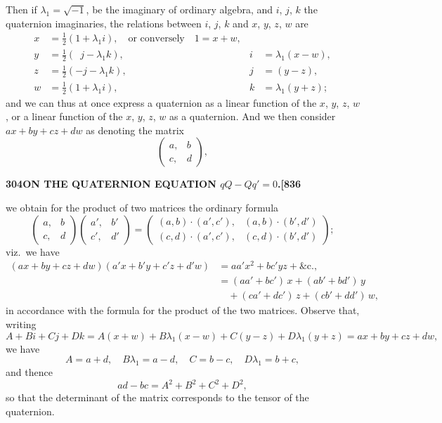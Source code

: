 \documentclass[11pt]{article}
\begin{document}
\medskip

Then if $\lambda_{1} = \sqrt{-1}$, be the imaginary of ordinary algebra, and $i$, $j$, $k$ the quaternion imaginaries, the relations between $i$, $j$, $k$ and $x$, $y$, $z$, $w$ are
\begin{align*}
x &= \tfrac{1}{2}(1 + \lambda_{1}i),\quad \text{or conversely}\quad 1 = x + w, \\
y &= \tfrac{1}{2}(\phantom{1}j - \lambda_{1}k),\quad &i &= \lambda_{1}(x - w), \\
z &= \tfrac{1}{2}(-j - \lambda_{1}k),\quad &j &= (y - z), \\
w &= \tfrac{1}{2}(1 + \lambda_{1}i),\quad &k &= \lambda_{1}(y + z);
\end{align*}
and we can thus at once express a quaternion as a linear function of the $x$, $y$, $z$, $w$, or a linear function of the $x$, $y$, $z$, $w$ as a quaternion. And we then consider $ax + by + cz + dw$ as denoting the matrix
\[
\begin{pmatrix} a, & b \\ c, & d \end{pmatrix},
\]

\newpage

\noindent\textbf{304}\hfill\textbf{ON THE QUATERNION EQUATION $qQ - Qq' = 0$.}\hfill\textbf{[836}

\bigskip

\noindent we obtain for the product of two matrices the ordinary formula
\[
\begin{pmatrix} a, & b \\ c, & d \end{pmatrix}\!\begin{pmatrix} a', & b' \\ c', & d' \end{pmatrix} = \begin{pmatrix} (a,b)\!\cdot\!(a',c'), & (a,b)\!\cdot\!(b',d') \\ (c,d)\!\cdot\!(a',c'), & (c,d)\!\cdot\!(b',d') \end{pmatrix};
\]
viz.\ we have
\begin{align*}
(ax + by + cz + dw)(a'x + b'y + c'z + d'w) &= aa'x^{2} + bc'yz + \&\text{c.}, \\
 &= (aa' + bc')\,x + (ab' + bd')\,y \\
 &\quad{}+ (ca' + dc')\,z + (cb' + dd')\,w,
\end{align*}
in accordance with the formula for the product of the two matrices. Observe that, writing
\[
A + Bi + Cj + Dk = A(x + w) + B\lambda_{1}(x - w) + C(y - z) + D\lambda_{1}(y + z) = a x + b y + c z + d w,
\]
we have
\[
A = a + d,\quad B\lambda_{1} = a - d,\quad C = b - c,\quad D\lambda_{1} = b + c,
\]
and thence
\[
ad - bc = A^{2} + B^{2} + C^{2} + D^{2},
\]
so that the determinant of the matrix corresponds to the tensor of the quaternion.
\end{document}

